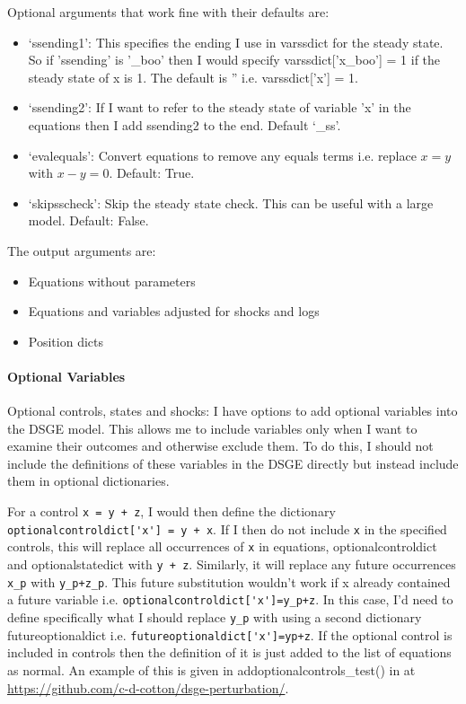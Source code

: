 \documentclass{article}
\theoremstyle{definition}
\begin{document}
Optional arguments that work fine with their defaults are:
\begin{itemize}
    \item `ssending1': This specifies the ending I use in varssdict for the steady state. So if 'ssending' is '\_boo' then I would specify varssdict['x\_boo'] = 1 if the steady state of x is 1. The default is '' i.e. varssdict['x'] = 1.
    \item `ssending2': If I want to refer to the steady state of variable 'x' in the equations then I add ssending2 to the end. Default `\_ss'.
    \item `evalequals': Convert equations to remove any equals terms i.e. replace $x = y$ with $x - y = 0$. Default: True.
    \item `skipsscheck': Skip the steady state check. This can be useful with a large model. Default: False.
\end{itemize}

The output arguments are:
\begin{itemize}
    \item Equations without parameters
    \item Equations and variables adjusted for shocks and logs
    \item Position dicts
\end{itemize}

\paragraph{Optional Variables}
Optional controls, states and shocks: I have options to add optional variables into the DSGE model. This allows me to include variables only when I want to examine their outcomes and otherwise exclude them. To do this, I should not include the definitions of these variables in the DSGE directly but instead include them in optional dictionaries.

For a control \verb|x = y + z|, I would then define the dictionary \verb|optionalcontroldict['x'] = y + x|. If I then do not include \verb|x| in the specified controls, this will replace all occurrences of \verb|x| in equations, optionalcontroldict and optionalstatedict with \verb|y + z|. Similarly, it will replace any future occurrences \verb|x_p| with \verb|y_p+z_p|. This future substitution wouldn't work if x already contained a future variable i.e. \verb|optionalcontroldict['x']=y_p+z|. In this case, I'd need to define specifically what I should replace \verb|y_p| with using a second dictionary futureoptionaldict i.e. \verb|futureoptionaldict['x']=yp+z|. If the optional control is included in controls then the definition of it is just added to the list of equations as normal. An example of this is given in addoptionalcontrols\_test() in  at \url{https://github.com/c-d-cotton/dsge-perturbation/}.
\end{document}
